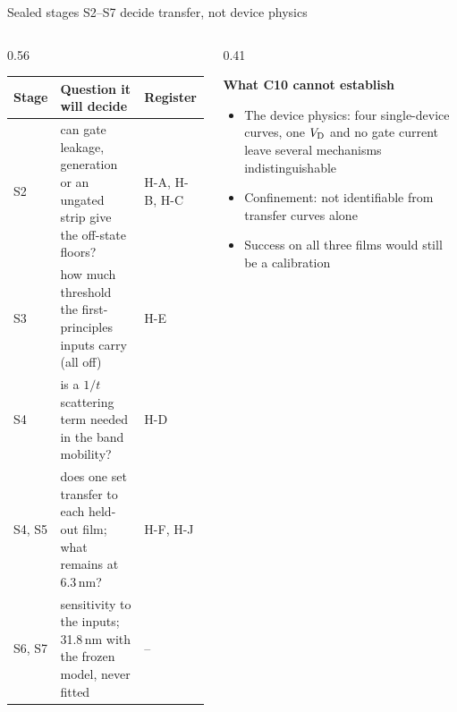 \begin{frame}[t]{Sealed stages S2--S7 decide transfer, not device physics}
  \fourTop
  \begin{center}
    \begin{minipage}{0.86\textwidth}
    \end{minipage}
  \end{center}
  \vspace{2.5mm}
  \begin{columns}[T,onlytextwidth]
    \begin{column}{0.56\textwidth}
      {\scriptsize
      \setlength{\tabcolsep}{3pt}
      \renewcommand{\arraystretch}{1.05}
      \begin{tabularx}{\linewidth}{@{}l>{\raggedright\arraybackslash}X l@{}}
        \toprule
        Stage & Question it will decide & Register \\
        \midrule
        S2 & can gate leakage, generation or an ungated strip give the off-state floors? & H-A, H-B, H-C \\
        S3 & how much threshold the first-principles inputs carry (all off) & H-E \\
        S4 & is a $1/t$ scattering term needed in the band mobility? & H-D \\
        S4, S5 & does one set transfer to each held-out film; what remains at 6.3\,nm? & H-F, H-J \\
        S6, S7 & sensitivity to the inputs; 31.8\,nm with the frozen model, never fitted & -- \\
        \bottomrule
      \end{tabularx}\par}
    \end{column}
    \begin{column}{0.41\textwidth}
      {\small\textbf{What C10 cannot establish}\par}
      \begin{itemize}\small
        \item The device physics: four single-device curves, one $V_{\mathrm{D}}$ and no gate current leave several mechanisms
          indistinguishable
        \item Confinement: not identifiable from transfer curves alone
        \item Success on all three films would still be a calibration
      \end{itemize}
    \end{column}
  \end{columns}
\end{frame}
